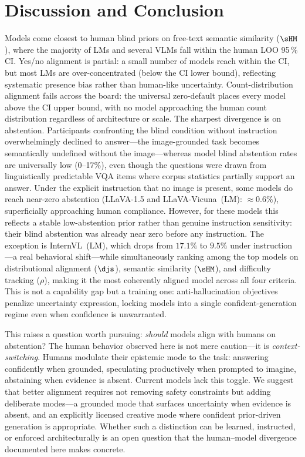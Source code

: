 \section{Discussion and Conclusion}
\label{sec:discussion}

Models come closest to human blind priors on free-text semantic similarity ($\sHM$), where the majority of LMs and several VLMs fall within the human LOO 95\,\% CI.
Yes/no alignment is partial: a small number of models reach within the CI, but most LMs are over-concentrated (below the CI lower bound), reflecting systematic presence bias rather than human-like uncertainty.
Count-distribution alignment fails across the board: the universal zero-default places every model above the CI upper bound, with no model approaching the human count distribution regardless of architecture or scale.
The sharpest divergence is on abstention.
Participants confronting the blind condition without instruction overwhelmingly declined to answer---the image-grounded task becomes semantically undefined without the image---whereas model blind abstention rates are universally low (0--17\%), even though the questions were drawn from linguistically predictable VQA items where corpus statistics partially support an answer.
Under the explicit instruction that no image is present, some models do reach near-zero abstention (LLaVA-1.5 and LLaVA-Vicuna~(LM): ${\approx}0.6\%$), superficially approaching human compliance.
However, for these models this reflects a stable low-abstention prior rather than genuine instruction sensitivity: their blind abstention was already near zero before any instruction.
The exception is InternVL~(LM), which drops from $17.1\%$ to $9.5\%$ under instruction---a real behavioral shift---while simultaneously ranking among the top models on distributional alignment ($\djs$), semantic similarity ($\sHM$), and difficulty tracking ($\rho$), making it the most coherently aligned model across all four criteria.
This is not a capability gap but a training one: anti-hallucination objectives penalize uncertainty expression, locking models into a single confident-generation regime even when confidence is unwarranted.

This raises a question worth pursuing: \emph{should} models align with humans on abstention?
The human behavior observed here is not mere caution---it is \emph{context-switching}.
Humans modulate their epistemic mode to the task: answering confidently when grounded, speculating productively when prompted to imagine, abstaining when evidence is absent.
Current models lack this toggle.
We suggest that better alignment requires not removing safety constraints but adding deliberate modes---a grounded mode that surfaces uncertainty when evidence is absent, and an explicitly licensed creative mode where confident prior-driven generation is appropriate.
Whether such a distinction can be learned, instructed, or enforced architecturally is an open question that the human--model divergence documented here makes concrete.


